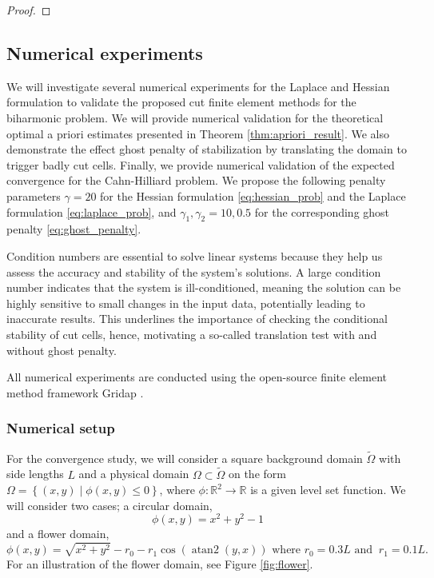 \documentclass[11pt]{article}
\DeclareMathOperator{\atantwo}{atan2}
\theoremstyle{remark}
\renewcommand{\le}{\leqslant}
\numberwithin{equation}{section}
\begin{document}
\begin{proof}
\end{proof}
\subsection{Numerical experiments}%
\label{sec:numerical_results}


We will investigate several numerical experiments for the Laplace and Hessian formulation to validate the proposed cut finite element methods for the biharmonic problem. We will provide numerical validation for the theoretical optimal a priori estimates presented in Theorem \ref{thm:apriori_result}. We also demonstrate the effect ghost penalty of stabilization by translating the domain to trigger badly cut cells. Finally, we provide numerical validation of the expected convergence for
the Cahn-Hilliard problem. We propose the following penalty parameters $\gamma = 20$ for the Hessian formulation \eqref{eq:hessian_prob} and the Laplace formulation \eqref{eq:laplace_prob}, and $\gamma _{1}, \gamma _{2} = 10, 0.5$ for the
corresponding ghost penalty \eqref{eq:ghost_penalty}.

Condition numbers are essential to solve linear systems because they help us assess the accuracy and stability of the system's solutions. A large condition number indicates that the system is ill-conditioned, meaning the solution can be highly
sensitive to small changes in the input data, potentially leading to inaccurate results. This underlines the importance of checking the conditional stability of cut cells, hence, motivating a so-called translation test with and without ghost
penalty.

All numerical experiments are conducted using the open-source finite element method framework Gridap \cite{verdugo22}.

\subsubsection{Numerical setup}%
\label{sub:numerical_results_for_cutcip_biharmonic_equation}
For the convergence study, we will consider a square background domain $\widetilde{\Omega} $ with side lengths $L$ and a physical domain $\Omega \subset \widetilde{\Omega}$ on the form $\Omega  = \left\{ ( x,y)  \mid \phi ( x,y) \le 0    \right\} $,
where $\phi: \mathbb{R} ^2 \to \mathbb{R}  $ is a given level set function. We will consider two cases; a circular domain,
\begin{equation}
    \label{eq:circle}
\phi( x,y) = x^{ 2} + y^{2} -1
\end{equation}
and a flower domain,
\begin{equation}
\label{eq:flower}
\phi ( x,y) =\sqrt{x^{2} + y^{2}} - r_{0} - r_{1}\cos(\atantwo(y,x)) \text{ where }  r_{0} = 0.3L  \text{ and } \ r_{1} = 0.1L .
\end{equation}
For an illustration of the flower domain, see Figure \ref{fig:flower}.
\end{document}
